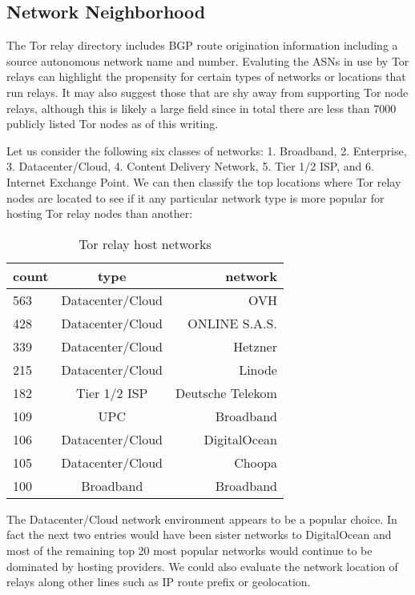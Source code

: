 \documentclass[sigconf]{acmart}
\begin{document}
\subsection{Network Neighborhood}

The Tor relay directory includes BGP route origination information
including a source autonomous network name and number.  Evaluting the
ASNs in use by Tor relays can highlight the propensity for certain types
of networks or locations that run relays.  It may also suggest those
that are shy away from supporting Tor node relays, although this is
likely a large field since in total there are less than 7000 publicly
listed Tor nodes as of this writing.

Let us consider the following six classes of networks: 1. Broadband, 2.
Enterprise, 3. Datacenter/Cloud, 4. Content Delivery Network, 5. Tier 1/2 ISP,
and 6. Internet Exchange Point.  We can then classify the top locations where Tor relay
nodes are located to see if it any particular network type is more
popular for hosting Tor relay nodes than another:

\begin{center}
  \begin{table}[h]
  \begin{tabular} { l | c | r }
  \hline
  count & type & network \\ \hline
  563 & Datacenter/Cloud & OVH \\ \hline
  428 & Datacenter/Cloud & ONLINE S.A.S.  \\ \hline
  339 & Datacenter/Cloud & Hetzner \\ \hline
  215 & Datacenter/Cloud & Linode \\ \hline
  182 & Tier 1/2 ISP & Deutsche Telekom \\ \hline
  109 & UPC & Broadband \\ \hline
  106 & Datacenter/Cloud & DigitalOcean \\ \hline
  105 & Datacenter/Cloud & Choopa \\ \hline
  100 & Broadband & Broadband \\ \hline
  \hline
  \end{tabular}
  \caption{Tor relay host networks}
  \end{table}
\end{center}

The Datacenter/Cloud network environment appears to be a popular choice.
In fact the next two entries would have been sister networks to
DigitalOcean and most of the remaining top 20 most popular networks
would continue to be dominated by hosting providers.  We could also
evaluate the network location of relays along other lines such as IP
route prefix or geolocation.
\end{document}

